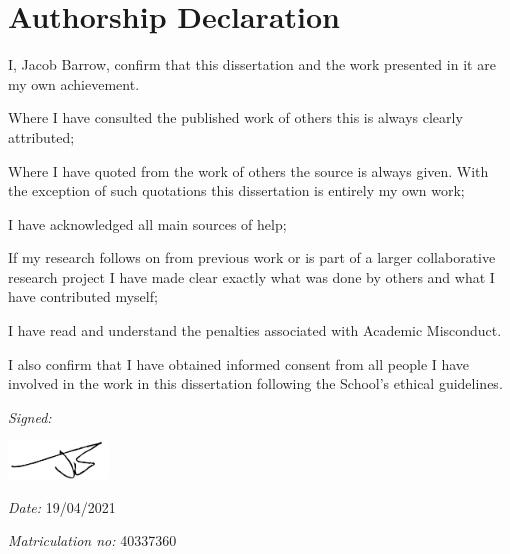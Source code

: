 
\section*{Authorship Declaration}
\vspace{0.5cm}
\begin{flushleft}
I, Jacob Barrow, confirm that this dissertation and the work presented in it are my own achievement.\newline

Where I have consulted the published work of others this is always clearly attributed;\newline

Where I have quoted from the work of others the source is always given. With the exception of such quotations this dissertation is entirely my own work;\newline

I have acknowledged all main sources of help; \newline

If my research follows on from previous work or is part of a larger collaborative research project I have made clear exactly what was done by others and what I have contributed myself;\newline

I have read and understand the penalties associated with Academic Misconduct.\newline

I also confirm that I have obtained informed consent from all people I have involved in the work in this dissertation following the School's ethical guidelines.\newline
\end{flushleft}

\begin{flushleft} \large
\emph{Signed:} \\
\end{flushleft}
\includegraphics[height=1cm]{images/sig.png}


\begin{flushleft} \large
\emph{Date:} 19/04/2021 \\
\end{flushleft}

\vspace{.5cm}

\begin{flushleft} \large
\emph{Matriculation no: } 40337360  \\
\end{flushleft}
